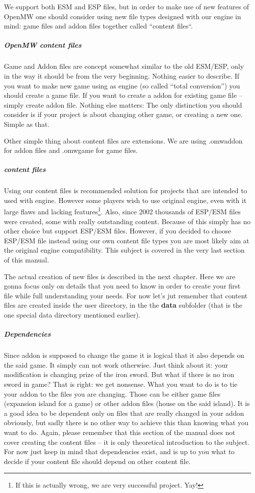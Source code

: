 We support both ESM and ESP files, but in order to make use of new features of OpenMW one should consider using new file types designed
with our engine in mind: game files and addon files together called ``content files``.

\subparagraph{OpenMW content files}
Game and Addon files are concept somewhat similar to the old ESM/ESP, only in the way it should be from the very beginning. Nothing easier
to describe. If you want to make new game using \OMW{} as engine (so called ``total conversion'') you should create a game file.
If you want to create a addon for existing game file -- simply create addon file. Nothing else matters: The only distinction you should
consider is if your project is about changing other game, or creating a new one. Simple as that.

Other simple thing about content files are extensions. We are using .omwaddon for addon files and .omwgame for game files.

\subparagraph{\MW{} content files}
Using our content files is recommended solution for projects that are intended to used with \OMW{} engine. However some players
wish to use original \MW{} engine, even with it large flaws and lacking features\footnote{If this is actually wrong, we are very
successful project. Yay!}. Also, since 2002 thousands of ESP/ESM files were created, some with really outstanding content.
Because of this \OCS{} simply has no other choice but support ESP/ESM files. However, if you decided to choose ESP/ESM file instead
using our own content file types you are most likely aim at the original engine compatibility. This subject is covered in the very
last section of this manual. %

The actual creation of new files is described in the next chapter. Here we are gonna focus only on details that you need to know
in order to create your first \OCS{} file while full understanding your needs. For now let's jut remember that content files
are created inside the user directory, in the the \textbf{data} subfolder (that is the one special data directory mentioned earlier).

\subparagraph{Dependencies}
Since addon is supposed to change the game it is logical that it also depends on the said game. It simply can not work otherwise.
Just think about it: your modification is changing prize of the iron sword. But what if there is no iron sword in game? That is right:
we get nonsense. What you want to do is to tie your addon to the files you are changing. Those can be either game files (expansion island
for a game) or other addon files (house on the said island). It is a good idea to be dependent only on files that are really changed
in your addon obviously, but sadly there is no other way to achieve this than knowing what you want to do. Again, please remember that
this section of the manual does not cover creating the content files -- it is only theoretical introduction to the subject. For now just
keep in mind that dependencies exist, and is up to you what to decide if your content file should depend on other content file.

